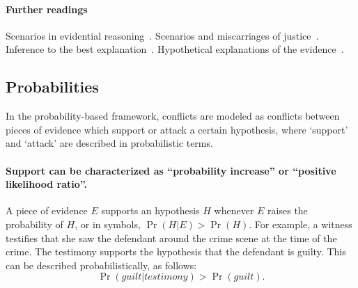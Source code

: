 \documentclass[10pt]{article}
\begin{document}
\paragraph{Further readings} 
Scenarios in evidential reasoning~\citep{bennettFeldman1981,penningtonHastie1993,penningtonHastie1993StoryModel}. Scenarios and miscarriages of justice~\citep{wagenaarEtal1993}. Inference to the best explanation~\citep{pardoAllen2008}. Hypothetical explanations of the evidence~\citep{thagard1989}. 

\subsection{Probabilities}

In the probability-based framework, conflicts are modeled as conflicts between pieces 
of evidence which support or attack a certain hypothesis, where `support' 
and `attack' are described in probabilistic terms. 

\paragraph{Support can be characterized as ``probability increase'' or ``positive likelihood ratio''.} 
A piece of evidence $E$ supports an 
hypothesis $H$ whenever $E$ raises the probability of $H$, or in symbols, 
$\Pr(H|E) > \Pr(H)$. 
For example, a witness 
testifies that she saw the defendant around the crime scene
 at the time of the crime. The testimony supports the hypothesis 
 that the defendant is guilty. 
This can be described probabilistically, as follows:
 \[ \Pr(\textit{guilt}|\textit{testimony}) > \Pr(\textit{guilt}).\] 
\end{document}
